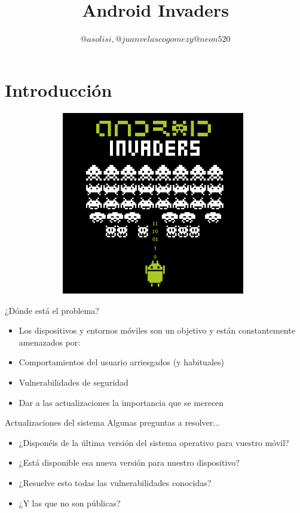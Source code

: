 \documentclass{beamer}
\title[Charla Android]{Android Invaders}
\author[LPB]{$@asolisi, @juanvelascogomez y @neon520$}
\institute[UGR]{Universidad de Granada}
\begin{document}
\maketitle

\section*{Introducción}

\begin{figure}[h]
\includegraphics[width=11cm, height=8cm]{androidInvaders.png}
\end{figure}

\begin{frame}{¿Dónde está el problema?}
	\begin{itemize}[<+-|alert@+>]
		
	\item Los dispositivos y entornos móviles son un objetivo y están constantemente amenazados por:
	\item Comportamientos del usuario arriesgados (y habituales)
	\item Vulnerabilidades de seguridad
	\item Dar a las actualizaciones la importancia que se merecen
	
	\end{itemize}
\end{frame}

\begin{frame}{Actualizaciones del sistema}
	Algunas preguntas a resolver...
	
\begin{itemize}[<+-|alert@+>]
	
	\item ¿Disponéis de la última versión del sistema operativo para vuestro móvil?
	\item ¿Está disponible esa nueva versión para nuestro dispositivo?
	\item ¿Resuelve esto todas las vulnerabilidades conocidas?
	\item ¿Y las que no son públicas?
	
\end{itemize}
\end{frame}
\end{document}
